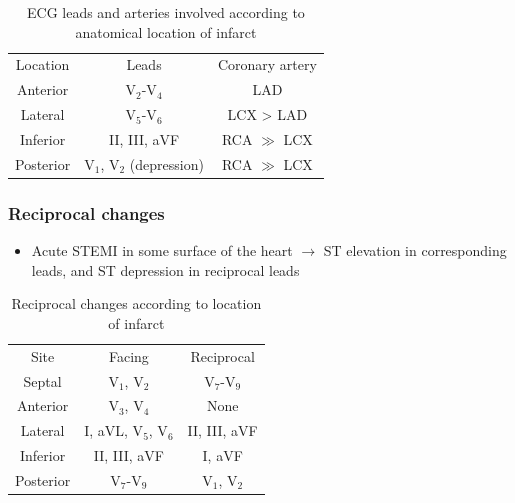 \documentclass[
  12pt,
]{memoir}
\providecommand{\tightlist}{%
  \setlength{\itemsep}{0pt}\setlength{\parskip}{0pt}}
\begin{document}
\renewcommand{\arraystretch}{1.5}
\begin{table}[h!]
\centering
\begin{tabular}{|c|c|c|}
\hline
\cellcolor{violet!60}\color{white}Location &
\cellcolor{violet!60}\color{white}Leads &
\cellcolor{violet!60}\color{white}Coronary artery \\
Anterior & V$_2$-V$_4$ & LAD \\
Lateral & V$_5$-V$_6$ & LCX > LAD \\
Inferior & II, III, aVF & RCA $\gg$ LCX \\
Posterior & V$_1$, V$_2$ (depression) & RCA $\gg$ LCX \\
\hline
\end{tabular}
\vspace{3mm}
\caption{ECG leads and arteries involved according to anatomical location of infarct}
\label{table:infarct-loc}
\end{table}

\hypertarget{reciprocal-changes}{%
\subsubsection{Reciprocal changes}\label{reciprocal-changes}}

\begin{itemize}
\tightlist
\item
  Acute STEMI in some surface of the heart \(\rightarrow\) ST elevation
  in corresponding leads, and ST depression in reciprocal leads
\end{itemize}

\renewcommand{\arraystretch}{1.5}
\begin{table}[h!]
\centering
\begin{tabular}{|c|c|c|}
\hline
\cellcolor{violet!60}\color{white}Site &
\cellcolor{violet!60}\color{white}Facing &
\cellcolor{violet!60}\color{white}Reciprocal \\
Septal & V$_1$, V$_2$ & V$_7$-V$_9$ \\
Anterior & V$_3$, V$_4$ & None \\
Lateral & I, aVL, V$_5$, V$_6$ & II, III, aVF \\
Inferior & II, III, aVF & I, aVF \\
Posterior & V$_7$-V$_9$ & V$_1$, V$_2$ \\
\hline
\end{tabular}
\vspace{3mm}
\caption{Reciprocal changes according to location of infarct}
\label{table:reciprocal}
\end{table}
\end{document}
